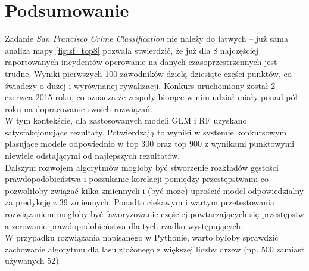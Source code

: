 \documentclass[11pt]{article} %
\begin{document}
\section{Podsumowanie}

Zadanie \textit{San Francisco Crime Classification} nie należy do łatwych -- już sama analiza mapy \ref{fig:sf_top8} pozwala stwierdzić, że już dla 8 najczęściej raportowanych incydentów operowanie na danych czasoprzestrzennych jest trudne. Wyniki pierwszych 100 zawodników dzielą dziesiąte części punktów, co świadczy o dużej i wyrównanej rywalizacji. Konkurs uruchomiony został 2 czerwca 2015 roku, co oznacza że zespoły biorące w nim udział miały ponad pół roku na dopracowanie swoich rozwiązań. \\

W tym kontekście, dla zastosowanych modeli GLM i RF uzyskano satysfakcjonujące rezultaty. Potwierdzają to wyniki w systemie konkursowym plasujące modele odpowiednio w top 300 oraz top 900 z wynikami punktowymi niewiele odstającymi od najlepszych rezultatów. \\

Dalszym rozwojem algorytmów mogłoby być stworzenie rozkładów gęstości prawdopodobieństwa i poszukanie korelacji pomiędzy przestępstwami co pozwoliłoby związać kilka zmiennych i (być może) uprościć model odpowiedzialny za predykcję z 39 zmiennych. Ponadto ciekawym i wartym przetestowania rozwiązaniem mogłoby być faworyzowanie częściej powtarzających się przestępstw a zerowanie prawdopodobieństwa dla tych rzadko występujących. \\

W przypadku rozwiązania napisanego w Pythonie, warto byłoby sprawdzić zachowanie algorytmu dla lasu złożonego z większej liczby drzew (np. 500 zamiast używanych 52). \\
\end{document}
